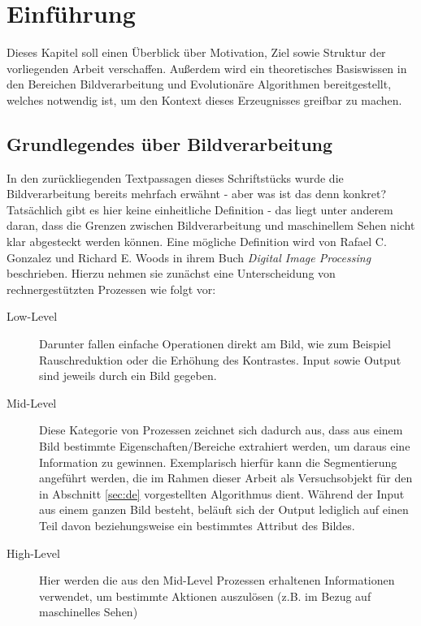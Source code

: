 
\chapter{Einführung}
\label{sec:intro}
	Dieses Kapitel soll einen Überblick über Motivation, Ziel sowie Struktur der vorliegenden Arbeit verschaffen. Außerdem wird ein theoretisches Basiswissen in den Bereichen Bildverarbeitung und Evolutionäre Algorithmen bereitgestellt, welches notwendig ist, um den Kontext dieses Erzeugnisses greifbar zu machen. 
		
	\section{Grundlegendes über Bildverarbeitung}
	\label{sec:bild-basics}
		
		In den zurückliegenden Textpassagen dieses Schriftstücks wurde die Bildverarbeitung bereits mehrfach erwähnt - aber was ist das denn konkret? Tatsächlich gibt es hier keine einheitliche Definition - das liegt unter anderem daran, dass die Grenzen zwischen Bildverarbeitung und maschinellem Sehen nicht klar abgesteckt werden können. Eine mögliche Definition wird von Rafael C. Gonzalez und Richard E. Woods in ihrem Buch \textit{Digital Image Processing} \cite{gonzalez-woods-imgproc} beschrieben. Hierzu nehmen sie zunächst eine Unterscheidung von rechnergestützten Prozessen wie folgt vor: 
		\begin{description}
			\item[Low-Level] Darunter fallen einfache Operationen direkt am Bild, wie zum Beispiel Rauschreduktion oder die Erhöhung des Kontrastes. Input sowie Output sind jeweils durch ein Bild gegeben.
			\item[Mid-Level] Diese Kategorie von Prozessen zeichnet sich dadurch aus, dass aus einem Bild bestimmte Eigenschaften/Bereiche extrahiert werden, um daraus eine Information zu gewinnen. Exemplarisch hierfür kann die Segmentierung angeführt werden, die im Rahmen dieser Arbeit als Versuchsobjekt für den in Abschnitt \ref{sec:de} vorgestellten Algorithmus dient. Während der Input aus einem ganzen Bild besteht, beläuft sich der Output lediglich auf einen Teil davon beziehungsweise ein bestimmtes Attribut des Bildes.
			\item[High-Level] Hier werden die aus den Mid-Level Prozessen erhaltenen Informationen verwendet, um bestimmte Aktionen auszulösen (z.B. im Bezug auf maschinelles Sehen)
		\end{description}
		
